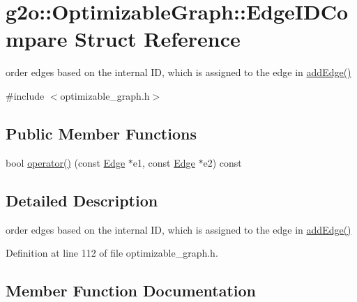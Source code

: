 \hypertarget{structg2o_1_1OptimizableGraph_1_1EdgeIDCompare}{}\section{g2o\+:\+:Optimizable\+Graph\+:\+:Edge\+I\+D\+Compare Struct Reference}
\label{structg2o_1_1OptimizableGraph_1_1EdgeIDCompare}


order edges based on the internal ID, which is assigned to the edge in \hyperlink{structg2o_1_1OptimizableGraph_a6831ed69fce3dba691f53302a2813070}{add\+Edge()}  




{\ttfamily \#include $<$optimizable\+\_\+graph.\+h$>$}

\subsection*{Public Member Functions}
\begin{DoxyCompactItemize}
\item 
bool \hyperlink{structg2o_1_1OptimizableGraph_1_1EdgeIDCompare_a52149d3f574b16d109c2e33173365646}{operator()} (const \hyperlink{classg2o_1_1OptimizableGraph_1_1Edge}{Edge} $\ast$e1, const \hyperlink{classg2o_1_1OptimizableGraph_1_1Edge}{Edge} $\ast$e2) const 
\end{DoxyCompactItemize}


\subsection{Detailed Description}
order edges based on the internal ID, which is assigned to the edge in \hyperlink{structg2o_1_1OptimizableGraph_a6831ed69fce3dba691f53302a2813070}{add\+Edge()} 

Definition at line 112 of file optimizable\+\_\+graph.\+h.



\subsection{Member Function Documentation}
